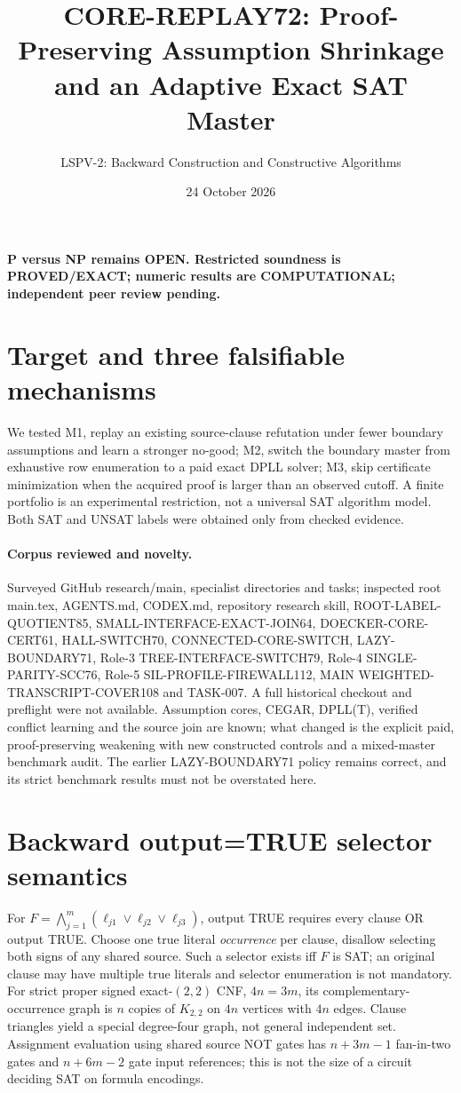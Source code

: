 \documentclass[11pt]{article}
\title{CORE-REPLAY72: Proof-Preserving Assumption Shrinkage and an Adaptive Exact SAT Master}
\author{LSPV-2: Backward Construction and Constructive Algorithms}
\date{24 October 2026}
\begin{document}
\maketitle
\begin{center}\textbf{P versus NP remains OPEN. Restricted soundness is PROVED/EXACT; numeric results are COMPUTATIONAL; independent peer review pending.}\end{center}
\section{Target and three falsifiable mechanisms}
We tested M1, replay an existing source-clause refutation under fewer boundary assumptions and learn a stronger no-good; M2, switch the boundary master from exhaustive row enumeration to a paid exact DPLL solver; M3, skip certificate minimization when the acquired proof is larger than an observed cutoff. A finite portfolio is an experimental restriction, not a universal SAT algorithm model. Both SAT and UNSAT labels were obtained only from checked evidence.
\paragraph{Corpus reviewed and novelty.}
Surveyed GitHub research/main, specialist directories and tasks; inspected root main.tex, AGENTS.md, CODEX.md, repository research skill, ROOT-LABEL-QUOTIENT85, SMALL-INTERFACE-EXACT-JOIN64, DOECKER-CORE-CERT61, HALL-SWITCH70, CONNECTED-CORE-SWITCH, LAZY-BOUNDARY71, Role-3 TREE-INTERFACE-SWITCH79, Role-4 SINGLE-PARITY-SCC76, Role-5 SIL-PROFILE-FIREWALL112, MAIN WEIGHTED-TRANSCRIPT-COVER108 and TASK-007. A full historical checkout and preflight were not available. Assumption cores, CEGAR, DPLL(T), verified conflict learning and the source join are known; what changed is the explicit paid, proof-preserving weakening with new constructed controls and a mixed-master benchmark audit. The earlier LAZY-BOUNDARY71 policy remains correct, and its strict benchmark results must not be overstated here.
\section{Backward output=TRUE selector semantics}
For $F=\bigwedge_{j=1}^m(\ell_{j1}\vee\ell_{j2}\vee\ell_{j3})$, output TRUE requires every clause OR output TRUE. Choose one true literal \emph{occurrence} per clause, disallow selecting both signs of any shared source. Such a selector exists iff $F$ is SAT; an original clause may have multiple true literals and selector enumeration is not mandatory. For strict proper signed exact-$(2,2)$ CNF, $4n=3m$, its complementary-occurrence graph is $n$ copies of $K_{2,2}$ on $4n$ vertices with $4n$ edges. Clause triangles yield a special degree-four graph, not general independent set. Assignment evaluation using shared source NOT gates has $n+3m-1$ fan-in-two gates and $n+6m-2$ gate input references; this is not the size of a circuit deciding SAT on formula encodings.
\end{document}
